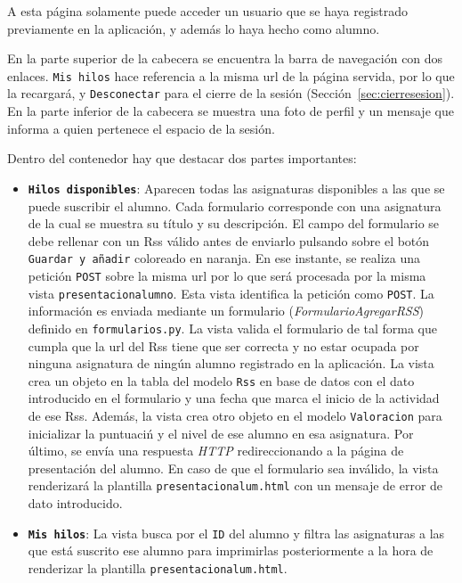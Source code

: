 \documentclass[a4paper, 12pt]{book}
\begin{document}
A esta p\'agina solamente puede acceder un usuario que se haya registrado previamente en la aplicaci\'on, y adem\'as lo haya hecho como alumno.

En la parte superior de la cabecera se encuentra la barra de navegaci\'on con dos enlaces. \texttt{Mis hilos} hace referencia a la misma url de la 
p\'agina servida, por lo que la recargar\'a, y \texttt{Desconectar} para el cierre de la sesi\'on (Secci\'on~\ref{sec:cierresesion}). En la parte inferior 
de la cabecera se muestra una foto de perfil y un mensaje que informa a quien pertenece el espacio de la sesi\'on.

Dentro del contenedor hay que destacar dos partes importantes:
\begin{itemize}
  \item {\bfseries \texttt{Hilos disponibles}}: Aparecen todas las asignaturas disponibles a las que se puede suscribir el alumno. Cada formulario 
  corresponde con una asignatura de la cual se muestra su t\'itulo y su descripci\'on. El campo del formulario se debe rellenar con un Rss v\'alido antes 
  de enviarlo pulsando sobre el bot\'on \texttt{Guardar y a\~nadir} coloreado en naranja. En ese instante, se realiza una petici\'on 
  \texttt{POST} sobre la misma url por lo que ser\'a procesada por la misma vista \texttt{presentacionalumno}. Esta vista identifica la petici\'on como 
  \texttt{POST}. La informaci\'on es enviada mediante un formulario (\textit{FormularioAgregarRSS}) definido en \texttt{formularios.py}. La vista valida 
  el formulario de tal forma que cumpla que la url del Rss tiene que ser correcta y no estar ocupada por ninguna asignatura de ning\'un alumno registrado 
  en la aplicaci\'on. La vista crea un objeto en la tabla del modelo \texttt{Rss} en base de datos con el dato introducido en el formulario y una fecha que 
  marca el inicio de la actividad de ese Rss. Adem\'as, la vista crea otro objeto en el modelo \texttt{Valoracion} para inicializar la puntuaci\'n y el 
  nivel de ese alumno en esa asignatura. Por \'ultimo, se env\'ia una respuesta \textit{HTTP} redireccionando a la p\'agina de presentaci\'on del alumno. 
  En caso de que el formulario sea inv\'alido, la vista renderizar\'a la plantilla \texttt{presentacionalum.html} con un mensaje de error de dato 
  introducido.
  \item {\bfseries \texttt{Mis hilos}}: La vista busca por el \texttt{ID} del alumno y filtra las asignaturas a las que est\'a suscrito ese alumno para 
  imprimirlas posteriormente a la hora de renderizar la plantilla \texttt{presentacionalum.html}.
\end{itemize}
\end{document}
